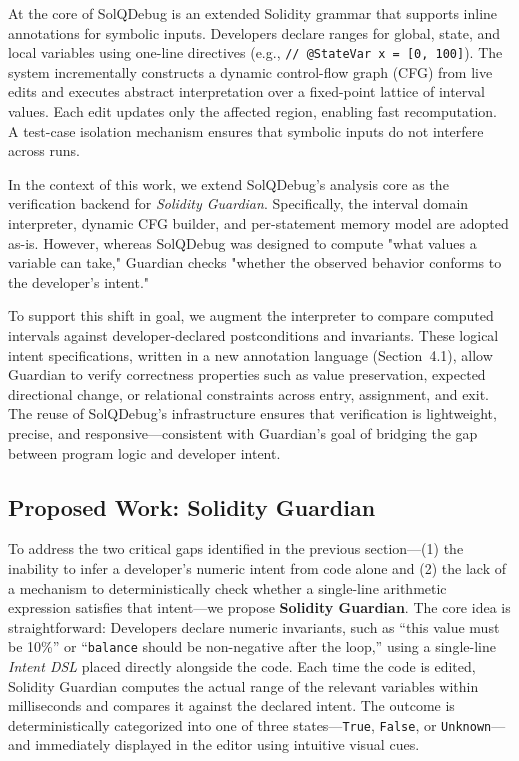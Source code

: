 \documentclass[pdflatex,sn-basic]{sn-jnl}%
\theoremstyle{thmstyleone}%
\theoremstyle{thmstyletwo}%
\theoremstyle{thmstylethree}%
\begin{document}
At the core of SolQDebug is an extended Solidity grammar that supports inline annotations for symbolic inputs. Developers declare ranges for global, state, and local variables using one-line directives (e.g., \texttt{// @StateVar x = [0, 100]}). The system incrementally constructs a dynamic control-flow graph (CFG) from live edits and executes abstract interpretation over a fixed-point lattice of interval values. Each edit updates only the affected region, enabling fast recomputation. A test-case isolation mechanism ensures that symbolic inputs do not interfere across runs.

In the context of this work, we extend SolQDebug's analysis core as the verification backend for \textit{Solidity Guardian}. Specifically, the interval domain interpreter, dynamic CFG builder, and per-statement memory model are adopted as-is. However, whereas SolQDebug was designed to compute "what values a variable can take," Guardian checks "whether the observed behavior conforms to the developer's intent."

To support this shift in goal, we augment the interpreter to compare computed intervals against developer-declared postconditions and invariants. These logical intent specifications, written in a new annotation language (Section~4.1), allow Guardian to verify correctness properties such as value preservation, expected directional change, or relational constraints across entry, assignment, and exit. The reuse of SolQDebug's infrastructure ensures that verification is lightweight, precise, and responsive—consistent with Guardian's goal of bridging the gap between program logic and developer intent.


\subsection{Proposed Work: Solidity Guardian}


To address the two critical gaps identified in the previous section—(1) the inability to infer a developer's numeric intent from code alone and (2) the lack of a mechanism to deterministically check whether a single-line arithmetic expression satisfies that intent—we propose \textbf{Solidity Guardian}. The core idea is straightforward:  
Developers declare numeric invariants, such as ``this value must be 10\%'' or ``\texttt{balance} should be non-negative after the loop,'' using a single-line \textit{Intent DSL} placed directly alongside the code. Each time the code is edited, Solidity Guardian computes the actual range of the relevant variables within milliseconds and compares it against the declared intent. The outcome is deterministically categorized into one of three states—\texttt{True}, \texttt{False}, or \texttt{Unknown}—and immediately displayed in the editor using intuitive visual cues.
\end{document}
